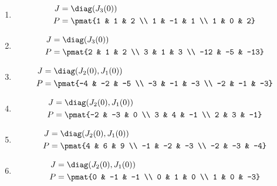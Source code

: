 \begin{enumerate}
\item

\begin{align*}
J &= \diag(J_{3}(0))\\
P &= \pmat{1 & 1 & 2 \\ 1 & -1 & 1 \\ 1 & 0 & 2}
\end{align*}

\item

\begin{align*}
J &= \diag(J_{3}(0))\\
P &= \pmat{2 & 1 & 2 \\ 3 & 1 & 3 \\ -12 & -5 & -13}
\end{align*}

\item

\begin{align*}
J &= \diag(J_{2}(0), J_{1}(0))\\
P &= \pmat{-4 & -2 & -5 \\ -3 & -1 & -3 \\ -2 & -1 & -3}
\end{align*}

\item

\begin{align*}
J &= \diag(J_{2}(0), J_{1}(0))\\
P &= \pmat{-2 & -3 & 0 \\ 3 & 4 & -1 \\ 2 & 3 & -1}
\end{align*}

\item

\begin{align*}
J &= \diag(J_{2}(0), J_{1}(0))\\
P &= \pmat{4 & 6 & 9 \\ -1 & -2 & -3 \\ -2 & -3 & -4}
\end{align*}

\item

\begin{align*}
J &= \diag(J_{2}(0), J_{1}(0))\\
P &= \pmat{0 & -1 & -1 \\ 0 & 1 & 0 \\ 1 & 0 & -3}
\end{align*}


\end{enumerate}
